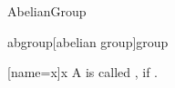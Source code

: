 \documentclass{stex}
\begin{document}
\begin{smodule}{AbelianGroup}

  \begin{extstructure}{abgroup}[abelian group]{group}
    \begin{sdefinition}[for={abgroup}]
      [name=x]{x}
      A  is called
      , if
      .
    \end{sdefinition}
  \end{extstructure}
\end{smodule}
\end{document}
